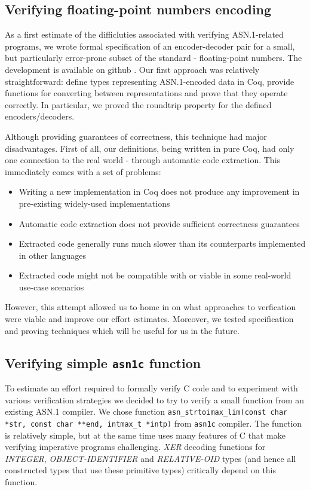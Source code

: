 \documentclass[acmsmall,nonacm]{acmart}
\begin{document}
\subsection{Verifying floating-point numbers encoding}

As a first estimate of the difficluties associated with
verifying ASN.1-related programs, we wrote
formal specification of an encoder-decoder pair for a small, but
particularly error-prone subset of the standard - floating-point numbers. The development is available on github \cite{ASN1Intro}.
Our first approach was relatively straightforward: define types
representing ASN.1-encoded data in Coq, provide functions for converting
between representations and prove that they operate correctly. In particular, we proved the roundtrip property for the defined encoders/decoders.

Although providing guarantees of correctness, this technique had major disadvantages.
First of all, our definitions, being written in pure Coq, had only one
connection to the real world - through automatic code extraction.
This immediately comes with a set of problems:

\begin{itemize}
\item Writing a new implementation in Coq does not produce any improvement in pre-existing widely-used implementations
\item Automatic code extraction does not provide sufficient correctness guarantees
\item Extracted code generally runs much slower than its counterparts implemented in other languages
\item Extracted code might not be compatible with or viable in some real-world use-case scenarios
\end{itemize}

However, this attempt allowed us to home in on what approaches
to verfication were viable and improve our effort estimates. Moreover, we tested specification and proving techniques which will be useful for us in the future.

\subsection{Verifying simple  \texttt{asn1c} function}

To estimate an effort required to formally verify C code and to
experiment with various verification strategies we decided to try to
verify a small function from an existing ASN.1 compiler. We chose
function \texttt{asn\_strtoimax\_lim(const char *str, const char **end, intmax\_t *intp)} from \texttt{asn1c} compiler.
The function is relatively simple, but at the same time uses many
features of C that make verifying imperative programs
challenging. \emph{XER} decoding functions for \emph{INTEGER},
\emph{OBJECT-IDENTIFIER} and \emph{RELATIVE-OID} types (and hence all
constructed types that use these primitive types) critically depend on
this function.
\end{document}
